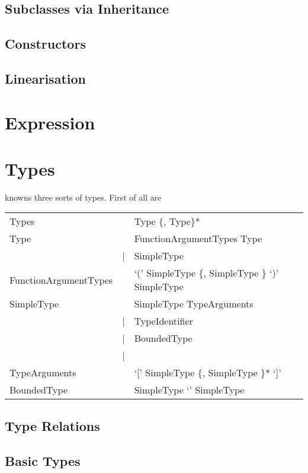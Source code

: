 \section{Subclasses via Inheritance}

\section{Constructors}
\section{Linearisation}

\chapter{Expression}

\chapter{Types}
\ooplss knowns three sorts of types. First of all are

\begin{listing}
	\begin{tabular}[H]{lrl}
		Types & \lra & Type \{, Type\}* \\
		Type & \lra & FunctionArgumentTypes \ra Type\\
				& | & SimpleType \\
		FunctionArgumentTypes & \lra & `(' SimpleType \{, SimpleType \} `)' \ra SimpleType \\
		SimpleType & \lra & SimpleType TypeArguments \\
								& | & TypeIdentifier \\
								& | & BoundedType \\
								& | & \mytype \\
		TypeArguments &\lra & `[' SimpleType \{, SimpleType \}* `]' \\
		BoundedType & \lra & SimpleType `\match' SimpleType \\
	\end{tabular}
\end{listing}

\section{Type Relations}
\section{Basic Types}

